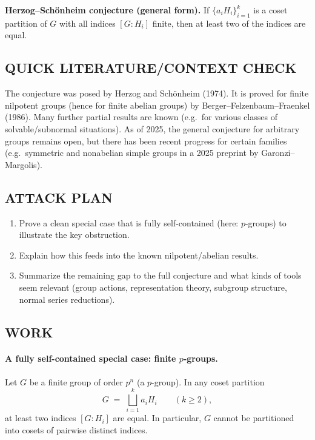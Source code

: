 \medskip
\noindent\textbf{Herzog--Sch\"onheim conjecture (general form).}
If $\{a_iH_i\}_{i=1}^k$ is a coset partition of $G$ with all indices $[G:H_i]$ finite, then at least two of the indices are equal.

\subsection*{QUICK LITERATURE/CONTEXT CHECK}
The conjecture was posed by Herzog and Sch\"onheim (1974).  It is proved for finite nilpotent groups (hence for finite abelian groups) by Berger--Felzenbaum--Fraenkel (1986).  Many further partial results are known (e.g.\ for various classes of solvable/subnormal situations).  As of 2025, the general conjecture for arbitrary groups remains open, but there has been recent progress for certain families (e.g.\ symmetric and nonabelian simple groups in a 2025 preprint by Garonzi--Margolis).

\subsection*{ATTACK PLAN}
\begin{enumerate}
\item Prove a clean special case that is fully self-contained (here: $p$-groups) to illustrate the key obstruction.
\item Explain how this feeds into the known nilpotent/abelian results.
\item Summarize the remaining gap to the full conjecture and what kinds of tools seem relevant (group actions, representation theory, subgroup structure, normal series reductions).
\end{enumerate}

\subsection*{WORK}
\paragraph{A fully self-contained special case: finite $p$-groups.}
\begin{theorem}\label{thm:pgroup}
Let $G$ be a finite group of order $p^n$ (a $p$-group).  In any coset partition
\[
G \;=\; \bigsqcup_{i=1}^k a_iH_i
\qquad (k\ge 2),
\]
at least two indices $[G:H_i]$ are equal.  In particular, $G$ cannot be partitioned into cosets of pairwise distinct indices.
\end{theorem}

